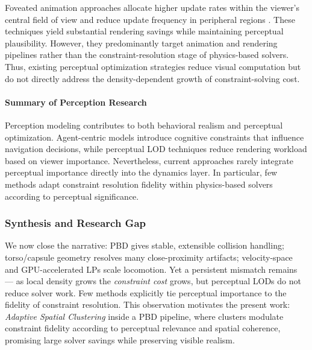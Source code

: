 Foveated animation approaches allocate higher update rates within the viewer's central field of view and reduce update frequency in peripheral regions \cite{Reddy2001Perceptual}. These techniques yield substantial rendering savings while maintaining perceptual plausibility. However, they predominantly target animation and rendering pipelines rather than the constraint-resolution stage of physics-based solvers. Thus, existing perceptual optimization strategies reduce visual computation but do not directly address the density-dependent growth of constraint-solving cost.

\paragraph{Summary of Perception Research}
Perception modeling contributes to both behavioral realism and perceptual optimization. Agent-centric models introduce cognitive constraints that influence navigation decisions, while perceptual LOD techniques reduce rendering workload based on viewer importance. Nevertheless, current approaches rarely integrate perceptual importance directly into the dynamics layer. In particular, few methods adapt constraint resolution fidelity within physics-based solvers according to perceptual significance.

\subsubsection{Synthesis and Research Gap}

%

We now close the narrative: PBD gives stable, extensible collision handling; torso/capsule geometry resolves many close-proximity artifacts; velocity-space and GPU-accelerated LPs scale locomotion. Yet a persistent mismatch remains — as local density grows the \emph{constraint cost} grows, but perceptual LODs do not reduce solver work. Few methods explicitly tie perceptual importance to the fidelity of constraint resolution. This observation motivates the present work: \emph{Adaptive Spatial Clustering} inside a PBD pipeline, where clusters modulate constraint fidelity according to perceptual relevance and spatial coherence, promising large solver savings while preserving visible realism.